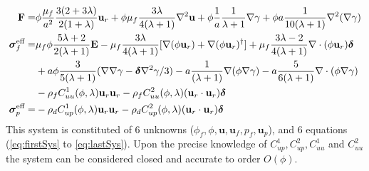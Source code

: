 \begin{align}
    \textbf{F}=&
    \phi
    \frac{\mu_f}{a^2}
    \frac{3(2+3\lambda)}{2(1+\lambda)}\textbf{u}_r
    + \phi\mu_f  \frac{3\lambda}{4(\lambda +1)} \grad^2 \textbf{u}
    + \phi \frac{1}{a}\frac{1}{\lambda +1} \grad \gamma
    + \phi a \frac{1}{10(\lambda +1)}\grad^2(\grad\gamma)\\
    \bm\sigma_f^\text{eff}
    =&
     \mu_f \phi \frac{5\lambda +2}{2(\lambda+1)} \textbf{E}
    - \mu_f \frac{3\lambda}{4(\lambda+1)} [
    \grad(\phi \textbf{u}_r)
    + \grad(\phi \textbf{u}_r)^\dagger]
    + \mu_f \frac{3\lambda - 2}{4(\lambda+1)} \div(\phi \textbf{u}_r)  \bm\delta\nonumber\\
    &+ a\phi \frac{3}{5(\lambda+1)}(\grad\grad\gamma-\bm\delta \grad^2\gamma/3)
    - a \frac{1}{(\lambda+1)}\grad (\phi \grad \gamma)
    - a \frac{5}{6(\lambda+1)}\div (\phi \grad \gamma)
    \nonumber \\
    &-\rho_f C^1_{uu}(\phi,\lambda)  \textbf{u}_r \textbf{u}_r
    -\rho_f C^2_{uu} (\phi,\lambda) (\textbf{u}_r \cdot \textbf{u}_r)\bm\delta
    \label{eq:sigma_feffff}\\
    \bm\sigma_p^\text{eff}
    =&
    -\rho_d C^1_{up}(\phi,\lambda) \textbf{u}_r \textbf{u}_r
    -\rho_d C^2_{up}(\phi,\lambda) (\textbf{u}_r \cdot \textbf{u}_r)\bm\delta
\end{align}
This system is constituted of 6 unknowns ($\phi_f,\phi,\textbf{u},\textbf{u}_f,p_f,\textbf{u}_p$), and 6 equations (\ref{eq:firstSys} to \ref{eq:lastSys}).  
Upon the precise knowledge of $C^1_{up}, C^2_{up}, C^1_{uu}$ and $C^2_{uu}$ the system can be considered closed and accurate to order $O(\phi)$. 

